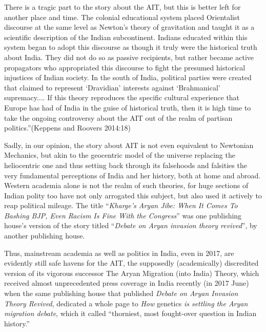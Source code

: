 \begin{myquote}
There is a tragic part to the story about the AIT, but this is better left for another place and time. The colonial educational system placed Orientalist discourse at the same level as Newton’s theory of gravitation and taught it as a scientific description of the Indian subcontinent. Indians educated within this system began to adopt this discourse as though it truly were the historical truth about India. They did not do so as passive recipients, but rather became active propagators who appropriated this discourse to fight the presumed historical injustices of Indian society. In the south of India, political parties were created that claimed to represent ‘Dravidian’ interests against ‘Brahmanical’ supremacy.... If this theory reproduces the specific cultural experience that Europe has had of India in the guise of historical truth, then it is high time to take the ongoing controversy about the AIT out of the realm of partisan politics.”\hfill (Keppens and Roovers 2014:18)
\end{myquote}

Sadly, in our opinion, the story about AIT is not even equivalent to Newtonian Mechanics, but akin to the geocentric model of the universe replacing the heliocentric one and thus setting back through its falsehoods and falsities the very fundamental perceptions of India and her history, both at home and abroad. Western academia alone is not the realm of such theories, for huge sections of Indian polity too have not only arrogated this subject, but also used it actively to reap political mileage. The title “\textit{Kharge’s Aryan Jibe: When It Comes To Bashing BJP, Even Racism Is Fine With the Congress}” was one publishing house’s version of the story titled “\textit{Debate on Aryan invasion theory revived}”, by another publishing house.

Thus, mainstream academia as well as politics in India, even in 2017, are evidently still safe havens for the AIT, the supposedly (academically) discredited version of its vigorous successor The Aryan Migration (into India) Theory, which received almost unprecedented press coverage in India recently (in 2017 June) when the same publishing house that published \textit{Debate on Aryan Invasion Theory Revived}, dedicated a whole page to \textit{How }genetics\textit{ is settling the Aryan migration debate}, which it called “thorniest, most fought-over question in Indian history.” 

